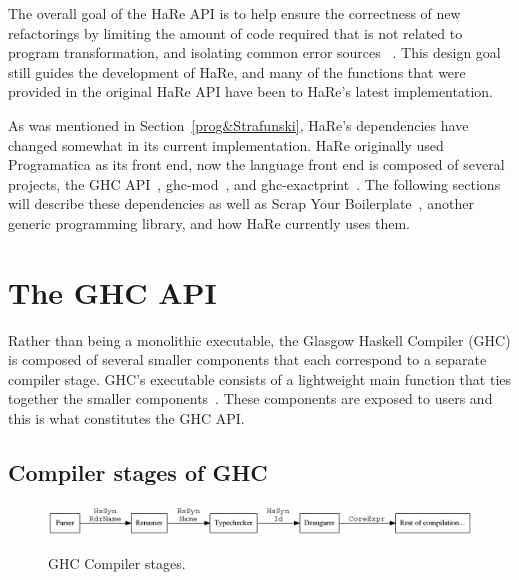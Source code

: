 The overall goal of the HaRe API is to help ensure the correctness of new refactorings by limiting the amount of code required that is not related to program transformation, and isolating common error sources \DIFaddbegin {}\DIFaddend ~\citep{hareApi}. This design goal still guides the development of HaRe, and many of the functions that were provided in the original HaRe API have been \DIFdelbegin {}\DIFdelend \DIFaddbegin {}\DIFaddend to HaRe's latest implementation.  

\DIFdelbegin %

\DIFdelend As was mentioned in Section~\ref{prog&Strafunski}, HaRe's dependencies have changed somewhat in its current implementation. HaRe originally used Programatica as its front end, now the language front end is composed of several projects\DIFdelbegin {}\DIFdelend , the GHC API~\citep{ghcApi}, ghc-mod~\citep{ghcMod}, and ghc-exactprint~\citep{exactprint}. The following sections will describe these dependencies as well as Scrap Your Boilerplate~\citep{syb}, another generic programming library, and how HaRe currently uses them.

\section{The GHC API}
\label{ghcApi}

Rather than being a monolithic executable, the Glasgow Haskell Compiler (GHC) is composed of several smaller components that each correspond to a separate compiler stage. GHC's executable consists of a lightweight main function that ties together the smaller components~\citep{ghcDesign}. These components are exposed to users  and this is what constitutes the GHC API.

\subsection{Compiler stages of GHC}\label{ghcStages}

\begin{figure}[t]
	\DIFdelbeginFL %
\DIFdelendFL \begin{center}
		\includegraphics[scale=.4]{graphVis/Chapter2/compilerStgs.png}
	\end{center}
	\caption{GHC Compiler stages.}
	\DIFaddbeginFL \label{compilerStages}
\DIFaddendFL \end{figure}

